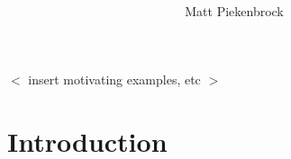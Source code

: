 \documentclass[10pt]{article}
\title{\vspace{-2.0em} \vspace{-0.5em}}
\author{Matt Piekenbrock}
\date{}
\begin{document}
\noindent

$<$ insert motivating examples, etc $>$


\section*{Introduction}




\end{document}
